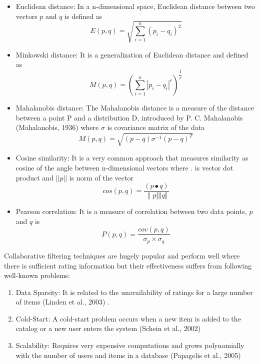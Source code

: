 \documentclass[12pt]{article}
\begin{document}
\begin{itemize}
	\item Euclidean distance: In a n{}-dimensional space, Euclidean distance between two vectors $p$ and $q$ is defined as
	\begin{equation}
	E(p, q) = \sqrt{\sum_{i=1}^n (p_{i} - q_{i})^{2}}
	\end{equation} 
\end{itemize}
\begin{itemize}
	\item Minkowski distance: It is a generalization of Euclidean distance and defined as
	\begin{equation}
	M(p, q) = ({\sum_{i=1}^n |p_{i} - q_{i}|^{r}})^{\dfrac{1}{r}}
	\end{equation} 
\end{itemize}
\begin{itemize}
	\item Mahalanobis distance: The Mahalanobis distance is a measure of the distance between a point P and a distribution D, introduced by P. C. Mahalanobis (Mahalanobis, 1936) \cite{mahalanobis} where $\sigma$ is covariance matrix of the data
	\begin{equation}
	M(p, q) = \sqrt{(p - q) \sigma^{-1} (p - q)^{T}}
	\end{equation} 
\end{itemize}
\begin{itemize}
	\item Cosine similarity: It is a very common approach that measures similarity as cosine of the angle between n-dimensional vectors where $.$ is vector dot product and $ ||p|| $ is  norm of the vector
	\begin{equation}
	cos(p, q) = \dfrac{(p \bullet q)}{\lVert p \Vert \Vert q \Vert}
	\end{equation} 
\end{itemize}
\begin{itemize}
	\item Pearson correlation: It is a measure of correlation between two data points, $p$ and $q$ is
	\begin{equation}
	P(p, q) = \dfrac{cov(p, q)}{\sigma _{p} \times \sigma _{q}}
	\end{equation} 
\end{itemize}
Collaborative filtering techniques are hugely popular and perform well where there is sufficient rating information but their effectiveness suffers from following well-known problems:
\begin{enumerate}
	\item Data Sparsity: It is related to the unavailability of ratings for a large number of items (Linden et al., 2003) \cite{linden}. 
	\item Cold-Start: A cold-start problem occurs when a new item is added to the catalog or a new user enters the system (Schein et al., 2002) \cite{schein}
	\item Scalability: Requires very expensive computations and grows polynomially with the number of users and items in a database (Papagelis et al., 2005) \cite{papagelis}
\end{enumerate}
\end{document}
